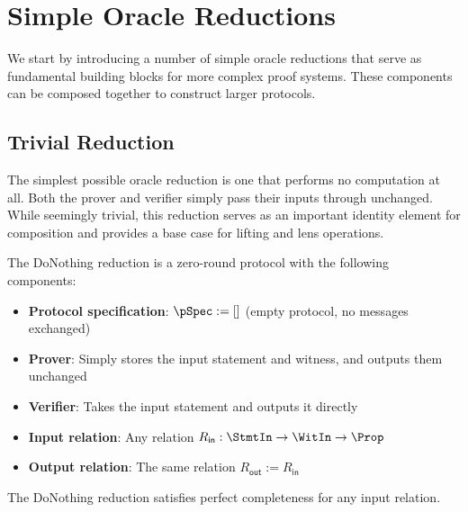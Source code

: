 \section{Simple Oracle Reductions}

We start by introducing a number of simple oracle reductions that serve as fundamental building blocks for more complex proof systems. These components can be composed together to construct larger protocols.

\subsection{Trivial Reduction}

The simplest possible oracle reduction is one that performs no computation at all. Both the prover and verifier simply pass their inputs through unchanged. While seemingly trivial, this reduction serves as an important identity element for composition and provides a base case for lifting and lens operations.

\begin{definition}
    \label{def:donothing_reduction}
    The DoNothing reduction is a zero-round protocol with the following components:
    \begin{itemize}
        \item \textbf{Protocol specification}: $\pSpec := []$ (empty protocol, no messages exchanged)
        \item \textbf{Prover}: Simply stores the input statement and witness, and outputs them unchanged
        \item \textbf{Verifier}: Takes the input statement and outputs it directly
        \item \textbf{Input relation}: Any relation $R_{\mathsf{in}} : \StmtIn \to \WitIn \to \Prop$
        \item \textbf{Output relation}: The same relation $R_{\mathsf{out}} := R_{\mathsf{in}}$
    \end{itemize}
    \leanok
\end{definition}

\begin{theorem}
    The DoNothing reduction satisfies perfect completeness for any input relation.
    \leanok
\end{theorem}

